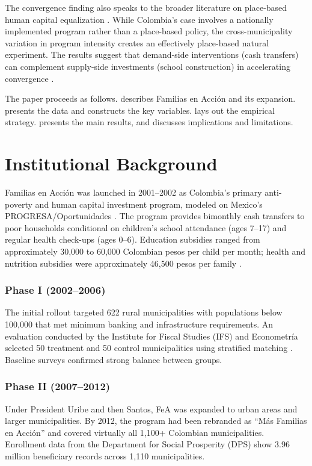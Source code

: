 \documentclass[12pt]{article}
\begin{document}
The convergence finding also speaks to the broader literature on place-based human capital equalization \citep{chetty2014land,card1992effect}. While Colombia's case involves a nationally implemented program rather than a place-based policy, the cross-municipality variation in program intensity creates an effectively place-based natural experiment. The results suggest that demand-side interventions (cash transfers) can complement supply-side investments (school construction) in accelerating convergence \citep{glewwe2009many}.

The paper proceeds as follows.  describes Familias en Acci\'{o}n and its expansion.  presents the data and constructs the key variables.  lays out the empirical strategy.  presents the main results, and  discusses implications and limitations.

\section{Institutional Background}
\label{sec:background}

Familias en Acci\'{o}n was launched in 2001--2002 as Colombia's primary anti-poverty and human capital investment program, modeled on Mexico's PROGRESA/Oportunidades \citep{attanasio2005effects}. The program provides bimonthly cash transfers to poor households conditional on children's school attendance (ages 7--17) and regular health check-ups (ages 0--6). Education subsidies ranged from approximately 30,000 to 60,000 Colombian pesos per child per month; health and nutrition subsidies were approximately 46,500 pesos per family \citep{attanasio2010education}.

\subsubsection*{Phase I (2002--2006)} The initial rollout targeted 622 rural municipalities with populations below 100,000 that met minimum banking and infrastructure requirements. An evaluation conducted by the Institute for Fiscal Studies (IFS) and Econometr\'{i}a selected 50 treatment and 50 control municipalities using stratified matching \citep{attanasio2005effects}. Baseline surveys confirmed strong balance between groups.

\subsubsection*{Phase II (2007--2012)} Under President Uribe and then Santos, FeA was expanded to urban areas and larger municipalities. By 2012, the program had been rebranded as ``M\'{a}s Familias en Acci\'{o}n'' and covered virtually all 1,100+ Colombian municipalities. Enrollment data from the Department for Social Prosperity (DPS) show 3.96 million beneficiary records across 1,110 municipalities.
\end{document}
